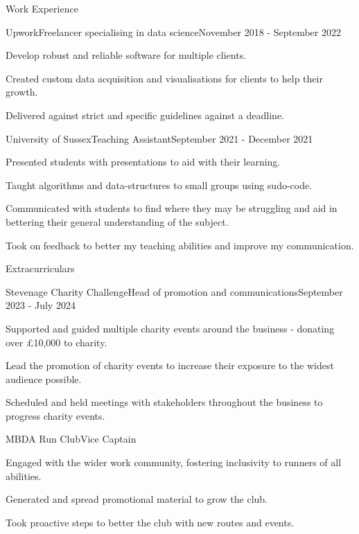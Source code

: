 \documentclass[a4paper]{article}
\newlength{\tabin}
\newlength{\secsep}
\newcommand{\lineunder}{\vspace*{-8pt} \\ \hspace*{-6pt} \hrulefill \\ \vspace*{-15pt}}
\newenvironment{tabbedsection}[1]{
  \begin{list}{}{
      \setlength{\itemsep}{0pt}
      \setlength{\labelsep}{0pt}
      \setlength{\labelwidth}{0pt}
      \setlength{\leftmargin}{\tabin}
      \setlength{\rightmargin}{\tabin}
      \setlength{\listparindent}{0pt}
      \setlength{\parsep}{0pt}
      \setlength{\parskip}{0pt}
      \setlength{\partopsep}{0pt}
      \setlength{\topsep}{#1}
    }
  \item[]
}{\end{list}}
\newenvironment{resume_section}[1]{
  \filbreak
  \vspace{2\secsep}
  \textsc{\large#1}
  \lineunder
  \begin{tabbedsection}{\secsep}
}{\end{tabbedsection}}
\newenvironment{resume_employer}[4]{
  \vspace{\secsep}
  \textbf{#1} \\ 
  \indent {\small #2} \hfill {\footnotesize#3 (#4)}
  \begin{tabbedsection}{0pt}
  \begin{subitems}
}{\end{subitems}\end{tabbedsection}}
\newenvironment{subitems}{
  \renewcommand{\labelitemi}{-}
  \begin{itemize}
      \setlength{\labelsep}{1em}
}{\end{itemize}}
\begin{document}
\begin{resume_section}{Work Experience}
  \begin{resume_employer}{Upwork}{Freelancer specialising in data science}{}{November 2018 - September 2022}
    \item Develop robust and reliable software for multiple clients.
    \item Created custom data acquisition and visualisations for clients to help their growth.
    \item Delivered against strict and specific guidelines against a deadline.
  \end{resume_employer}
  
  \begin{resume_employer}{University of Sussex}{Teaching Assistant}{}{September 2021 - December 2021}
    \item Presented students with presentations to aid with their learning.
    \item Taught algorithms and data-structures to small groups using sudo-code.
    \item Communicated with students to find where they may be struggling and aid in bettering their general understanding of the subject.
    \item Took on feedback to better my teaching abilities and improve my communication.
  \end{resume_employer}
  
\end{resume_section}

\begin{resume_section}{Extracurriculars}
  \begin{resume_employer}{Stevenage Charity Challenge}{Head of promotion and communications}{}{September 2023 - July 2024}
    \item Supported and guided multiple charity events around the business - donating over £10,000 to charity.
    \item Lead the promotion of charity events to increase their exposure to the widest audience possible.
    \item Scheduled and held meetings with stakeholders throughout the business to progress charity events.
  \end{resume_employer}
  \begin{resume_employer}{MBDA Run Club}{Vice Captain}
    \item Engaged with the wider work community, fostering inclusivity to runners of all abilities.
    \item Generated and spread promotional material to grow the club.
    \item Took proactive steps to better the club with new routes and events.
  \end{resume_employer}
\end{resume_section}
\end{document}
